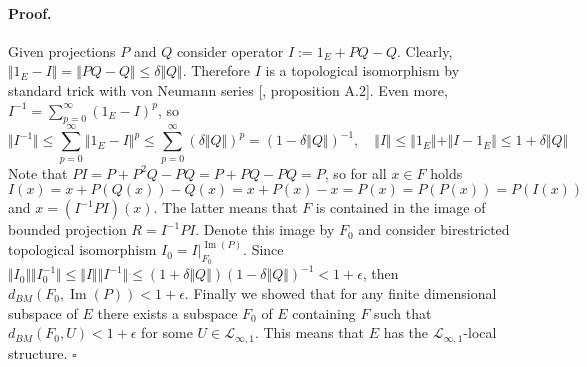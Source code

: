 \documentclass[12pt]{article}
\renewenvironment{proof}{\paragraph{Proof.}}{\hfill$\square$\medskip}
\begin{document}
\begin{proof}
    Given projections $P$ and $Q$ consider operator $I:=1_E+PQ-Q$. Clearly,
    $\Vert 1_E-I\Vert=\Vert PQ-Q\Vert\leq \delta\Vert Q\Vert$. Therefore $I$
    is a topological isomorphism by standard trick with von Neumann series
        [\cite{KalAlbTopicsBanSpTh},  proposition A.2]. Even more,
    $I^{-1}=\sum_{p=0}^\infty{(1_E-I)}^p$, so
    $$
        \Vert I^{-1}\Vert
        \leq\sum_{p=0}^\infty\Vert 1_E-I\Vert^p
        \leq\sum_{p=0}^\infty{(\delta\Vert Q\Vert)}^p
        ={(1-\delta\Vert Q\Vert)}^{-1},
        \quad
        \Vert I\Vert\leq\Vert 1_E\Vert+\Vert I-1_E\Vert\leq 1+\delta\Vert Q\Vert
    $$
    Note that $PI=P+P^2Q-PQ=P+PQ-PQ=P$, so for all $x\in F$ holds
    $$
        I(x)=x+P(Q(x))-Q(x)=x+P(x)-x=P(x)=P(P(x))=P(I(x))
    $$
    and $x=(I^{-1}PI)(x)$. The latter means that $F$ is contained in the image
    of bounded projection $R=I^{-1}PI$. Denote this image by $F_0$ and consider
    birestricted topological isomorphism $I_0=I|_{F_0}^{\operatorname{Im}(P)}$.
    Since $\Vert I_0\Vert\Vert I_0^{-1}\Vert\leq\Vert I\Vert\Vert
        I^{-1}\Vert\leq(1+\delta\Vert Q\Vert){(1-\delta\Vert
            Q\Vert)}^{-1}<1+\epsilon$, then
    $d_{BM}(F_0,\operatorname{Im}(P))<1+\epsilon$. Finally we showed that for
    any finite dimensional subspace of $E$ there exists a subspace $F_0$ of $E$
    containing $F$ such that $d_{BM}(F_0,U)<1+\epsilon$ for some
    $U\in\mathcal{L}_{\infty,1}$. This means that $E$ has the
    $\mathcal{L}_{\infty,1}$-local structure.
\end{proof}
\end{document}
